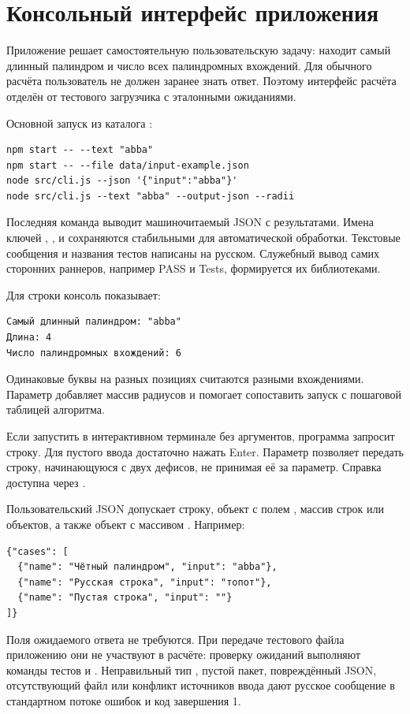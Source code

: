 \section{Консольный интерфейс приложения}
Приложение решает самостоятельную пользовательскую задачу: находит самый длинный палиндром и число всех палиндромных вхождений. Для обычного расчёта пользователь не должен заранее знать ответ. Поэтому интерфейс расчёта отделён от тестового загрузчика с эталонными ожиданиями.

Основной запуск из каталога :
\begin{lstlisting}
npm start -- --text "abba"
npm start -- --file data/input-example.json
node src/cli.js --json '{"input":"abba"}'
node src/cli.js --text "abba" --output-json --radii
\end{lstlisting}
Последняя команда выводит машиночитаемый JSON с результатами. Имена ключей , ,  и  сохраняются стабильными для автоматической обработки. Текстовые сообщения и названия тестов написаны на русском. Служебный вывод самих сторонних раннеров, например PASS и Tests, формируется их библиотеками.

Для строки  консоль показывает:
\begin{Verbatim}[fontsize=\small,frame=single]
Самый длинный палиндром: "abba"
Длина: 4
Число палиндромных вхождений: 6
\end{Verbatim}
Одинаковые буквы на разных позициях считаются разными вхождениями. Параметр  добавляет массив радиусов и помогает сопоставить запуск с пошаговой таблицей алгоритма.

Если запустить  в интерактивном терминале без аргументов, программа запросит строку. Для пустого ввода достаточно нажать Enter. Параметр  позволяет передать строку, начинающуюся с двух дефисов, не принимая её за параметр. Справка доступна через .

Пользовательский JSON допускает строку, объект с полем , массив строк или объектов, а также объект с массивом . Например:
\begin{Verbatim}[fontsize=\small,frame=single]
{"cases": [
  {"name": "Чётный палиндром", "input": "abba"},
  {"name": "Русская строка", "input": "топот"},
  {"name": "Пустая строка", "input": ""}
]}
\end{Verbatim}
Поля ожидаемого ответа не требуются. При передаче тестового файла приложению они не участвуют в расчёте: проверку ожиданий выполняют команды тестов и . Неправильный тип , пустой пакет, повреждённый JSON, отсутствующий файл или конфликт источников ввода дают русское сообщение в стандартном потоке ошибок и код завершения 1.

